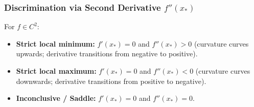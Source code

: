\subsubsection{Discrimination via Second Derivative $f''(x_*)$}
For $f \in C^2$:
\begin{itemize}
    \item \textbf{Strict local minimum:} $f'(x_*) = 0$ and $f''(x_*) > 0$ (curvature curves upwards; derivative transitions from negative to positive).
    \item \textbf{Strict local maximum:} $f'(x_*) = 0$ and $f''(x_*) < 0$ (curvature curves downwards; derivative transitions from positive to negative).
    \item \textbf{Inconclusive / Saddle:} $f'(x_*) = 0$ and $f''(x_*) = 0$.
\end{itemize}

